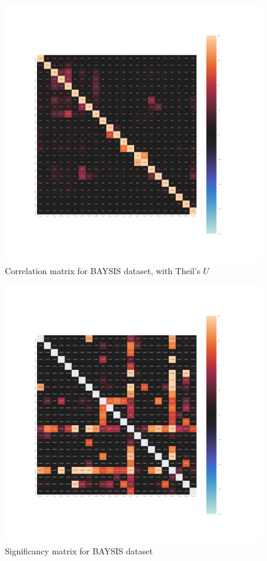 \documentclass[a4paper,headsepline,footsepline,fontsize=11pt,BCOR=12mm,DIV=12]{report}
\begin{document}
\begin{appendices}
\begin{figure}[h]
	\centering
	\includegraphics[scale=0.35, trim=2cm 6cm 0cm 6cm]{../CorrAnalysis/data/BAYSIS/01_dataset/plots/baysis_dataset_corr_theils}
	\caption{Correlation matrix for BAYSIS dataset, with Theil's $U$}
	\label{img:appendix_correlation_matrix_dataset_theils}
\end{figure}
\restoregeometry

\begin{figure}[h]
	\centering
	\includegraphics[scale=0.35, trim=2cm 6cm 0cm 6cm]{../CorrAnalysis/data/BAYSIS/01_dataset/plots/baysis_dataset_sign_cramers}
	\caption{Significancy matrix for BAYSIS dataset}
	\label{img:appendix_correlation_matrix_dataset_theils}
\end{figure}
\restoregeometry


\end{appendices}
\end{document}
